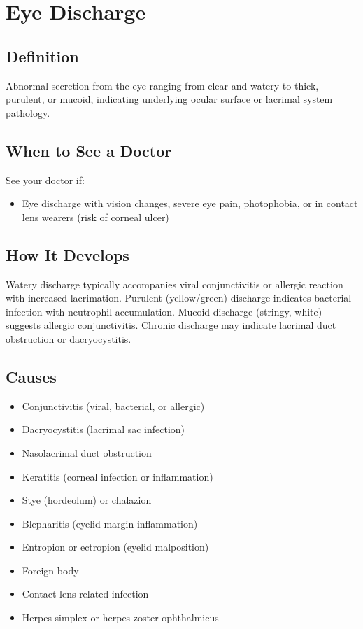 \chapter{Eye Discharge}

\section*{Definition}
Abnormal secretion from the eye ranging from clear and watery to thick, purulent, or mucoid, indicating underlying ocular surface or lacrimal system pathology.

\section*{When to See a Doctor}
See your doctor if:
\begin{itemize}
  \item Eye discharge with vision changes, severe eye pain, photophobia, or in contact lens wearers (risk of corneal ulcer)
\end{itemize}

\section*{How It Develops}
Watery discharge typically accompanies viral conjunctivitis or allergic reaction with increased lacrimation. Purulent (yellow/green) discharge indicates bacterial infection with neutrophil accumulation. Mucoid discharge (stringy, white) suggests allergic conjunctivitis. Chronic discharge may indicate lacrimal duct obstruction or dacryocystitis.

\section*{Causes}
\begin{itemize}
  \item Conjunctivitis (viral, bacterial, or allergic)
  \item Dacryocystitis (lacrimal sac infection)
  \item Nasolacrimal duct obstruction
  \item Keratitis (corneal infection or inflammation)
  \item Stye (hordeolum) or chalazion
  \item Blepharitis (eyelid margin inflammation)
  \item Entropion or ectropion (eyelid malposition)
  \item Foreign body
  \item Contact lens-related infection
  \item Herpes simplex or herpes zoster ophthalmicus
\end{itemize}

